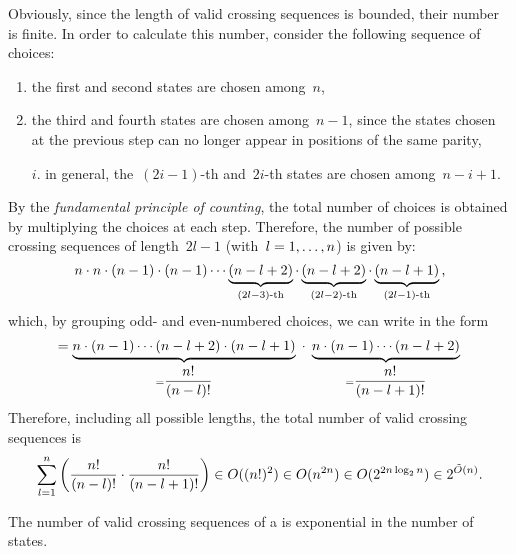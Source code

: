 Obviously, since the length of valid crossing sequences is bounded, their number is finite.
In order to calculate this number, consider the following sequence of choices:
\begin{enumerate}
	\item \label{itm:num-crosseq-1} the first and second states are chosen among~$n$,
	\item the third and fourth states are chosen among~$n-1$, since the states chosen at the previous step can no longer appear in positions of the same parity,
	\item[$i$.] in general, the~$(2i-1)$-th and~$2i$-th states are chosen among~$n-i+1$.
\end{enumerate}
By the \emph{fundamental principle of counting}, the total number of choices is obtained by multiplying the choices at each step.
Therefore, the number of possible crossing sequences of length~$2l-1$ (with~$l=1,\dots,n$) is given by:
\begin{equation*}
	n \cdot n \cdot (n-1) \cdot (n-1) \cdots \underbrace{(n-l+2)}_{(2l-3)\text{-th}} \cdot \underbrace{(n-l+2)}_{(2l-2)\text{-th}} \cdot \underbrace{(n-l+1)}_{(2l-1)\text{-th}} \text,
\end{equation*}
which, by grouping odd- and even-numbered choices, we can write in the form
\begin{equation*}
	= \underbrace{n \cdot (n-1) \cdots (n-l+2) \cdot (n-l+1)}_{=\dfrac{n!}{(n-l)!}} \; \cdot \; \underbrace{n \cdot (n-1) \cdots (n-l+2)}_{=\dfrac{n!}{(n-l+1)!}} \\
\end{equation*}
Therefore, including all possible lengths, the total number of valid crossing sequences is
\begin{align*}
	\sum_{l=1}^n \left(\frac{n!}{(n-l)!}\cdot\frac{n!}{(n-l+1)!}\right) \in O((n!)^2) \in O(n^{2n}) \in O(2^{2n \log_2 n}) \in 2^{\tilde O(n)} \text.
\end{align*}

\begin{fact}\label{fact:crossing-2DFA-num}
	The number of valid crossing sequences of a \TDFA is exponential in the number of states.
\end{fact}


